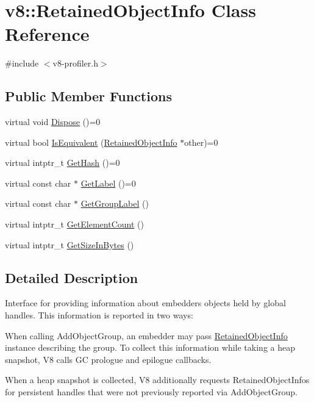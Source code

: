 \hypertarget{classv8_1_1RetainedObjectInfo}{}\section{v8\+:\+:Retained\+Object\+Info Class Reference}
\label{classv8_1_1RetainedObjectInfo}


{\ttfamily \#include $<$v8-\/profiler.\+h$>$}

\subsection*{Public Member Functions}
\begin{DoxyCompactItemize}
\item 
virtual void \mbox{\hyperlink{classv8_1_1RetainedObjectInfo_a5011203f7c5949049ba36b8059f03eca}{Dispose}} ()=0
\item 
virtual bool \mbox{\hyperlink{classv8_1_1RetainedObjectInfo_a286103bb076c85415919c86b1838c990}{Is\+Equivalent}} (\mbox{\hyperlink{classv8_1_1RetainedObjectInfo}{Retained\+Object\+Info}} $\ast$other)=0
\item 
virtual intptr\+\_\+t \mbox{\hyperlink{classv8_1_1RetainedObjectInfo_a6fdbfa242b95615e63f08433419c8066}{Get\+Hash}} ()=0
\item 
virtual const char $\ast$ \mbox{\hyperlink{classv8_1_1RetainedObjectInfo_ad19106fc7f0499fd45005077551d54c0}{Get\+Label}} ()=0
\item 
virtual const char $\ast$ \mbox{\hyperlink{classv8_1_1RetainedObjectInfo_adf835370c5516f2a89dd2d3f83dee10b}{Get\+Group\+Label}} ()
\item 
virtual intptr\+\_\+t \mbox{\hyperlink{classv8_1_1RetainedObjectInfo_ae6865597469bc7d28bd8ec71b4b890bd}{Get\+Element\+Count}} ()
\item 
virtual intptr\+\_\+t \mbox{\hyperlink{classv8_1_1RetainedObjectInfo_a1a899eed0b1f6e046edc3c7a7c08aa8c}{Get\+Size\+In\+Bytes}} ()
\end{DoxyCompactItemize}


\subsection{Detailed Description}
Interface for providing information about embedder\textquotesingle{}s objects held by global handles. This information is reported in two ways\+:


\begin{DoxyEnumerate}
\item When calling Add\+Object\+Group, an embedder may pass \mbox{\hyperlink{classv8_1_1RetainedObjectInfo}{Retained\+Object\+Info}} instance describing the group. To collect this information while taking a heap snapshot, V8 calls GC prologue and epilogue callbacks.
\item When a heap snapshot is collected, V8 additionally requests Retained\+Object\+Infos for persistent handles that were not previously reported via Add\+Object\+Group.
\end{DoxyEnumerate}


